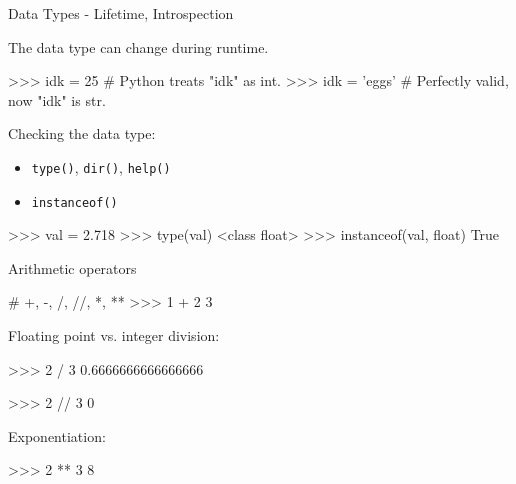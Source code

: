 \documentclass[10pt]{beamer}
\begin{document}
\begin{frame}[fragile]{Data Types - Lifetime, Introspection}

	\pause
	The data type can change during runtime.

	\pause
	\begin{pythoncode}
		>>>  idk = 25      # Python treats "idk" as int.
		>>>  idk = 'eggs'  # Perfectly valid, now "idk" is str.
	\end{pythoncode}

	\pause
	Checking the data type:
	\begin{itemize}
		\item \pause \small{\texttt{type()}, \texttt{dir()}, \texttt{help()}}
		\item \pause \small{\texttt{instanceof()}}
	\end{itemize}

	\pause
	\begin{pythoncode}
		>>> val = 2.718
		>>> type(val)
		<class float>
		>>> instanceof(val, float)
		True
	\end{pythoncode}
\end{frame}



\begin{frame}[fragile]{Arithmetic operators}

    \begin{pythoncode}
        # +, -, /, //, *, **
        >>> 1 + 2
        3
    \end{pythoncode}

    \pause

    Floating point vs. integer division:

    \begin{pythoncode}
        >>> 2 / 3
        0.6666666666666666

        >>> 2 // 3
        0
    \end{pythoncode}

    \pause

    Exponentiation:

    \begin{pythoncode}
        >>> 2 ** 3
        8
    \end{pythoncode}
\end{frame}

\end{document}
